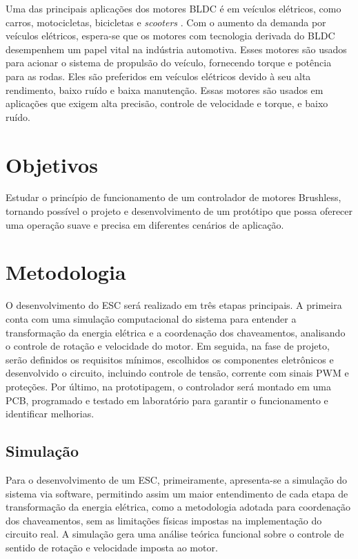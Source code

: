 \documentclass[12pt, a4paper, openright, oneside, brazilian]{abntex2}
\begin{document}
 Uma das principais aplicações dos motores BLDC é em veículos elétricos, como carros, motocicletas, bicicletas e \textit{scooters} \cite{chau2007emerging}. Com o aumento da demanda por veículos elétricos, espera-se que os motores com tecnologia derivada do BLDC desempenhem um papel vital na indústria automotiva. Esses motores são usados para acionar o sistema de propulsão do veículo, fornecendo torque e potência para as rodas. Eles são preferidos em veículos elétricos devido à seu alta rendimento, baixo ruído e baixa manutenção. Essas motores são usados em aplicações que exigem alta precisão, controle de velocidade e torque, e baixo ruído.

\chapter{Objetivos}
Estudar o princípio de funcionamento de um controlador de motores Brushless, tornando possível o projeto e desenvolvimento de um protótipo que possa oferecer uma operação suave e precisa em diferentes cenários de aplicação.

\chapter{Metodologia}
O desenvolvimento do ESC será realizado em três etapas principais. A primeira conta com uma simulação computacional do sistema para entender a transformação da energia elétrica e a coordenação dos chaveamentos, analisando o controle de rotação e velocidade do motor. Em seguida, na fase de projeto, serão definidos os requisitos mínimos, escolhidos os componentes eletrônicos e desenvolvido o circuito, incluindo controle de tensão, corrente com sinais PWM e proteções. Por último, na prototipagem, o controlador será montado em uma PCB, programado e testado em laboratório para garantir o funcionamento e identificar melhorias.

\section{Simulação}
Para o desenvolvimento de um ESC, primeiramente, apresenta-se a simulação do sistema via software, permitindo assim um maior entendimento de cada etapa de transformação da energia elétrica, como a metodologia adotada para coordenação dos chaveamentos, sem as limitações físicas impostas na implementação do circuito real. A simulação gera uma análise teórica funcional sobre o controle de sentido de rotação e velocidade imposta ao motor.
\end{document}
